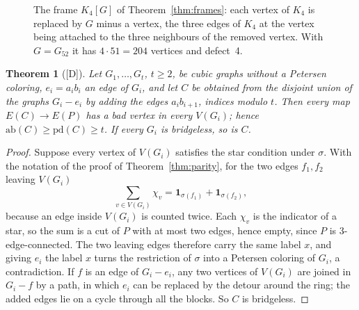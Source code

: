 \documentclass[11pt]{article}
\newtheorem{theorem}{Theorem}[section]
\theoremstyle{definition}
\theoremstyle{remark}
\newcommand{\PG}{P}
\newcommand{\Gfty}{G_{52}}
\newcommand{\pd}{\mathrm{pd}}
\newcommand{\ab}{\mathrm{ab}}
\newcommand{\dd}{\textup{[D]}}
\begin{document}
\begin{figure}[htbp]\centering
{}
\caption{The frame $K_4[G]$ of Theorem~\ref{thm:frames}: each vertex of $K_4$ is replaced by $G$ minus
a vertex, the three edges of $K_4$ at the vertex being attached to the three neighbours of the
removed vertex. With $G = \Gfty$ it has $4 \cdot 51 = 204$ vertices and defect~4.}\label{fig:frame}
\end{figure}

\begin{theorem}[\dd]\label{thm:rings}
Let $G_1, \dots, G_t$, $t \ge 2$, be cubic graphs without a Petersen coloring, $e_i = a_ib_i$ an
edge of $G_i$, and let $C$ be obtained from the disjoint union of the graphs $G_i - e_i$ by adding
the edges $a_ib_{i+1}$, indices modulo $t$. Then every map $E(C) \to E(\PG)$ has a bad vertex in
every $V(G_i)$; hence $\ab(C) \ge \pd(C) \ge t$. If every $G_i$ is bridgeless, so is $C$.
\end{theorem}

\begin{proof}
Suppose every vertex of $V(G_i)$ satisfies the star condition under $\sigma$. With the notation of
the proof of Theorem~\ref{thm:parity}, for the two edges $f_1, f_2$ leaving $V(G_i)$
\begin{equation}\label{eq:flux}
\sum_{v \in V(G_i)} \chi_v = \mathbf 1_{\sigma(f_1)} + \mathbf 1_{\sigma(f_2)},
\end{equation}
because an edge inside $V(G_i)$ is counted twice. Each $\chi_v$ is the indicator of a star, so the sum is a cut of $\PG$ with at most two edges, hence
empty, since $\PG$ is 3-edge-connected. The two leaving edges therefore carry the same label $x$,
and giving $e_i$ the label $x$ turns the restriction of $\sigma$ into a Petersen coloring of
$G_i$, a contradiction. If $f$ is an edge of $G_i - e_i$, any two vertices of $V(G_i)$ are joined
in $G_i - f$ by a path, in which $e_i$ can be replaced by the detour around the ring; the added
edges lie on a cycle through all the blocks. So $C$ is bridgeless.
\end{proof}
\end{document}
